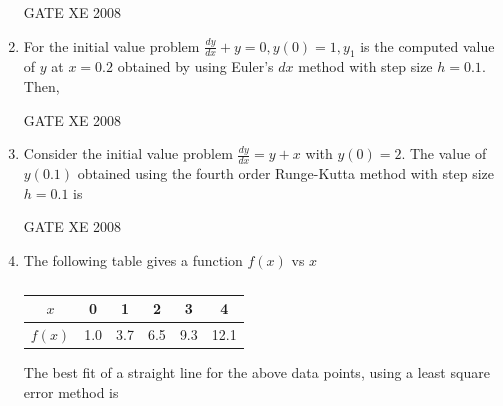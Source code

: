 \documentclass[12pt]{article}
\begin{document}
\begin{enumerate}[label=Q\arabic*.]
\begin{enumerate}[label=(\Alph*)]
\end{enumerate}

GATE XE 2008
\item  For the initial value problem\newline
$\frac{dy}{dx}+y=0 , y(0)=1 , y_{1}$  is the computed value of $y$ at $x = 0.2$ obtained by using Euler's $dx$ method with step size $h =0.1$. Then,

\begin{enumerate}[label=(\Alph*)]
\end{enumerate}

GATE XE 2008
\item Consider the initial value problem\newline
$\frac{dy}{dx}=y+x$ with $y(0)=2$.\newline
The value of $y(0.1)$ obtained using the fourth order Runge-Kutta method with step size $h = 0.1$ is

\begin{enumerate}[label=(\Alph*)]
\end{enumerate}

GATE XE 2008
\item The following table gives a function $f(x)$ vs $x$\newline
\begin{table}[H]     \centering     \caption{}     \label{}     \begin{tabular}{|c|c|c|c|c|c|}
\hline
    $x$ & 0 & 1 & 2 & 3 & 4 \\
    \hline
    $f(x)$ & 1.0 & 3.7 & 6.5 & 9.3 & 12.1\\
    \hline
\end{tabular} \end{table}
The best fit of a straight line for the above data points, using a least square error method is


\end{enumerate}
\end{document}
